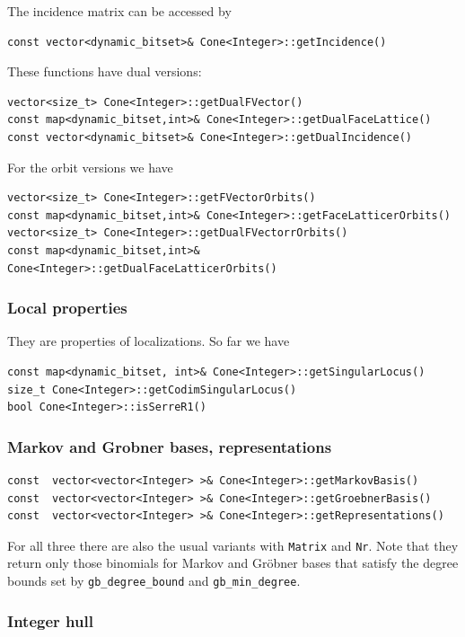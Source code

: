 \begin{small}
The incidence matrix can be accessed by

\begin{Verbatim}
const vector<dynamic_bitset>& Cone<Integer>::getIncidence()
\end{Verbatim}

These functions have dual versions:

\begin{Verbatim}
vector<size_t> Cone<Integer>::getDualFVector()
const map<dynamic_bitset,int>& Cone<Integer>::getDualFaceLattice()
const vector<dynamic_bitset>& Cone<Integer>::getDualIncidence()
\end{Verbatim}

For the orbit versions we have
\begin{Verbatim}
vector<size_t> Cone<Integer>::getFVectorOrbits()
const map<dynamic_bitset,int>& Cone<Integer>::getFaceLatticerOrbits()
vector<size_t> Cone<Integer>::getDualFVectorrOrbits()
const map<dynamic_bitset,int>& Cone<Integer>::getDualFaceLatticerOrbits()
\end{Verbatim}

\subsubsection{Local properties}

They are properties of localizations. So far we have
\begin{Verbatim}
const map<dynamic_bitset, int>& Cone<Integer>::getSingularLocus()
size_t Cone<Integer>::getCodimSingularLocus()
bool Cone<Integer>::isSerreR1()
\end{Verbatim}

\subsubsection{Markov and Grobner bases, representations}
\begin{Verbatim}
const  vector<vector<Integer> >& Cone<Integer>::getMarkovBasis()
const  vector<vector<Integer> >& Cone<Integer>::getGroebnerBasis()
const  vector<vector<Integer> >& Cone<Integer>::getRepresentations()
\end{Verbatim}
For all three there are also the usual variants with \verb|Matrix| and \verb|Nr|.
Note that they return only those binomials for Markov and Gröbner bases that satisfy the degree bounds set by \verb|gb_degree_bound| and \verb|gb_min_degree|.


\subsubsection{Integer hull}


\end{small}
